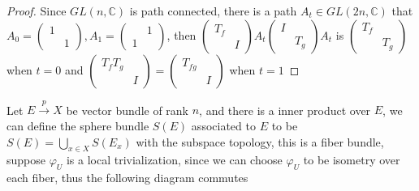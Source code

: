 \documentclass[main]{subfiles}
\begin{document}
\begin{proof}
Since $GL(n,\mathbb C)$ is path connected, there is a path $A_t\in GL(2n,\mathbb C)$ that $A_0=\begin{pmatrix}
1&\\
&1
\end{pmatrix},A_1=\begin{pmatrix}
&1\\
1&
\end{pmatrix}$, then $\begin{pmatrix}
T_f \\
&I
\end{pmatrix}A_t\begin{pmatrix}
I \\
&T_g
\end{pmatrix}A_t$ is $\begin{pmatrix}
T_f \\
&T_g
\end{pmatrix}$ when $t=0$ and $\begin{pmatrix}
T_fT_g \\
&I
\end{pmatrix}=\begin{pmatrix}
T_{fg} \\
&I
\end{pmatrix}$ when $t=1$
\end{proof}

\begin{definition}
Let $E\xrightarrow{p}X$ be vector bundle of rank $n$, and there is a inner product over $E$, we can define the sphere bundle $S(E)$ associated to $E$ to be $S(E)=\displaystyle\bigcup_{x\in X}S(E_x)$ with the subspace topology, this is a fiber bundle, suppose $\varphi_U$ is a local trivialization, since we can choose $\varphi_U$ to be isometry over each fiber, thus the following diagram commutes \par
\begin{center}
\end{center}
\end{definition}
\end{document}
